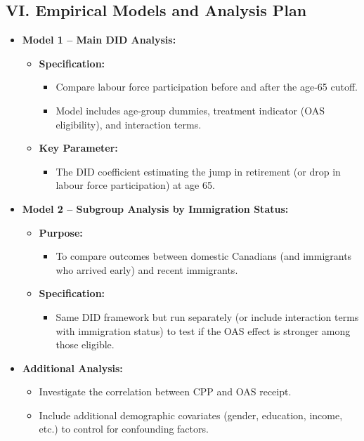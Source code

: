 \documentclass[
]{article}
\providecommand{\tightlist}{%
  \setlength{\itemsep}{0pt}\setlength{\parskip}{0pt}}
\begin{document}
\subsection{VI. Empirical Models and Analysis
Plan}\label{vi.-empirical-models-and-analysis-plan}

\begin{itemize}
\tightlist
\item
  \textbf{Model 1 -- Main DID Analysis:}

  \begin{itemize}
  \tightlist
  \item
    \textbf{Specification:}

    \begin{itemize}
    \tightlist
    \item
      Compare labour force participation before and after the age-65
      cutoff.
    \item
      Model includes age-group dummies, treatment indicator (OAS
      eligibility), and interaction terms.
    \end{itemize}
  \item
    \textbf{Key Parameter:}

    \begin{itemize}
    \tightlist
    \item
      The DID coefficient estimating the jump in retirement (or drop in
      labour force participation) at age 65.
    \end{itemize}
  \end{itemize}
\item
  \textbf{Model 2 -- Subgroup Analysis by Immigration Status:}

  \begin{itemize}
  \tightlist
  \item
    \textbf{Purpose:}

    \begin{itemize}
    \tightlist
    \item
      To compare outcomes between domestic Canadians (and immigrants who
      arrived early) and recent immigrants.
    \end{itemize}
  \item
    \textbf{Specification:}

    \begin{itemize}
    \tightlist
    \item
      Same DID framework but run separately (or include interaction
      terms with immigration status) to test if the OAS effect is
      stronger among those eligible.
    \end{itemize}
  \end{itemize}
\item
  \textbf{Additional Analysis:}

  \begin{itemize}
  \tightlist
  \item
    Investigate the correlation between CPP and OAS receipt.
  \item
    Include additional demographic covariates (gender, education,
    income, etc.) to control for confounding factors.
  \end{itemize}
\end{itemize}
\end{document}
